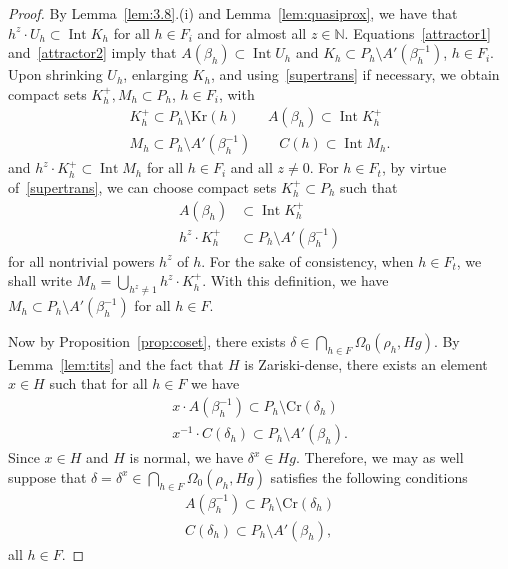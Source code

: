 \documentclass{amsart}
\theoremstyle{plain}
\theoremstyle{definition}
\theoremstyle{remark}
\DeclareMathOperator{\Int}{Int}
\begin{document}
\begin{proof}
By Lemma~\ref{lem:3.8}.(i) and Lemma~\ref{lem:quasiprox},
we have that $h^{z}\cdot U_{h} \subset \Int K_{h}$
for all $h \in F_{i}$ and for almost all $z \in \mathbb{N}$.
Equations~\eqref{attractor1}
and~\eqref{attractor2} imply that $A(\beta_{h}) \subset \Int U_{h}$ and $K_{h} \subset
P_{h}\setminus A'(\beta_{h}^{-1})$, $h \in F_{i}$.
Upon shrinking $U_{h}$,
enlarging $K_{h}$, and using~\eqref{supertrans} if necessary, we obtain compact sets $K_{h}^{+}, M_{h} \subset P_{h}$, $h \in
F_{i}$, with
\begin{gather*}
K_{h}^{+} \subset P_{h}\setminus \mathrm{Kr}(h)\qquad A(\beta_{h})\subset \Int K_{h}^{+}\\
M_{h } \subset P_{h} \setminus A'(\beta_{h}^{-1})\qquad C(h) \subset \Int M_{h}.
\end{gather*}
and  $h^{z}\cdot K_{h}^{+} \subset \Int M_{h}$ for all $h \in F_{i}$ and all $z \neq 0$.
For $h \in F_{t}$, by virtue of~\eqref{supertrans}, we can choose compact sets
$K_{h}^{+} \subset P_{h}$ such that 
\begin{align*}
A(\beta_{h}) &\subset \Int K_{h}^{+}\\
h^{z}\cdot K_{h}^{+} &\subset P_{h} \setminus A'(\beta_{h}^{-1})
\end{align*}
for all nontrivial powers $h^{z}$ of $h$. For the sake of consistency, when $h \in F_{t}$,
we shall write $M_{h} = \bigcup_{h^{z} \neq 1} h^{z}\cdot K_{h}^{+}$. With this
definition,
we have $M_{h}\subset P_{h} \setminus A'(\beta_{h}^{-1})$ for all $h \in F$.

Now by Proposition~\ref{prop:coset}, there exists $\delta \in \bigcap_{h \in F}
\Omega_{0}(\rho_{h}, Hg)$. By Lemma~\ref{lem:tits}
and the fact that $H$ is Zariski-dense, there
exists an element $x \in H$ such that for all $h \in F$ we have
\begin{gather*}
x\cdot A(\beta_{h}^{-1}) \subset P_{h} \setminus \mathrm{Cr}(\delta_{h})\\
x^{-1}\cdot C(\delta_{h}) \subset P_{h} \setminus A'(\beta_{h}).
\end{gather*}
Since $x \in H$ and $H$ is normal,
we have $\delta^{x} \in Hg$. Therefore, we may as well suppose that  $\delta = 
\delta^{x} \in \bigcap_{h \in F}
\Omega_{0}(\rho_{h}, Hg)$ satisfies the following conditions
\begin{gather}
A(\beta_{h}^{-1}) \subset P_{h} \setminus \mathrm{Cr}(\delta_{h})\label{eqn:delta2}\\
C(\delta_{h}) \subset P_{h} \setminus A'(\beta_{h}),\label{eqn:delta3}
\end{gather}
all $h \in F$.


\end{proof}
\end{document}
